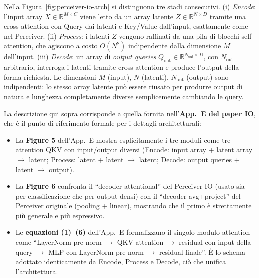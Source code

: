 \documentclass[
  11pt,
]{article}
\begin{document}
Nella Figura~\ref{fig:perceiver-io-arch} si distinguono tre stadi consecutivi. (i) \emph{Encode}: l'input array $X \in \mathbb{R}^{M \times C}$ viene letto da un array latente $Z \in \mathbb{R}^{N \times D}$ tramite una cross-attention con Query dai latenti e Key/Value dall'input, esattamente come nel Perceiver. (ii) \emph{Process}: i latenti $Z$ vengono raffinati da una pila di blocchi self-attention, che agiscono a costo $O(N^2)$ indipendente dalla dimensione $M$ dell'input. (iii) \emph{Decode}: un array di \emph{output queries} $Q_{\text{out}} \in \mathbb{R}^{N_{\text{out}} \times D}$, con $N_{\text{out}}$ arbitrario, interroga i latenti tramite cross-attention e produce l'output della forma richiesta. Le dimensioni $M$ (input), $N$ (latenti), $N_{\text{out}}$ (output) sono indipendenti: lo stesso array latente può essere riusato per produrre output di natura e lunghezza completamente diverse semplicemente cambiando le query.

\begin{notabox}[title={\textbf{Riferimenti paper per questa architettura}}]
La descrizione qui sopra corrisponde a quella fornita nell'\textbf{App.\ E del paper IO}, che è il punto di riferimento formale per i dettagli architetturali:
\begin{itemize}\setlength\itemsep{0.1em}
\item La \textbf{Figure 5} dell'App.\ E mostra esplicitamente i tre moduli come tre attention QKV con input/output diversi (Encode: input array + latent array $\to$ latent; Process: latent + latent $\to$ latent; Decode: output queries + latent $\to$ output).
\item La \textbf{Figure 6} confronta il ``decoder attentional'' del Perceiver IO (usato sia per classificazione che per output densi) con il ``decoder avg+project'' del Perceiver originale (pooling + linear), mostrando che il primo è strettamente più generale e più espressivo.
\item Le \textbf{equazioni (1)--(6)} dell'App.\ E formalizzano il singolo modulo attention come ``LayerNorm pre-norm $\to$ QKV-attention $\to$ residual con input della query $\to$ MLP con LayerNorm pre-norm $\to$ residual finale''. È lo schema adottato identicamente da Encode, Process e Decode, ciò che unifica l'architettura.
\end{itemize}
\end{notabox}
\end{document}
